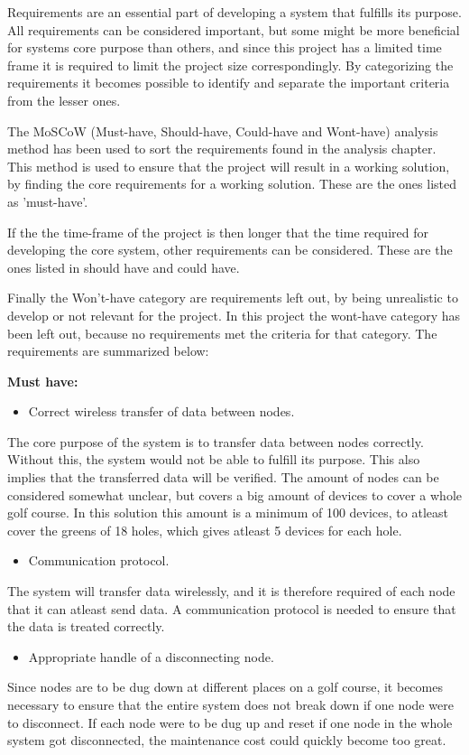 Requirements are an essential part of developing a system that fulfills its purpose. All requirements can be considered important, but some might be more beneficial for systems core purpose than others, and since this project has a limited time frame it is required to limit the project size correspondingly. By categorizing the requirements it becomes possible to identify and separate the important criteria from the lesser ones.

The MoSCoW (Must-have, Should-have, Could-have and Wont-have) analysis method has been used to sort the requirements found in the analysis chapter. This method is used to ensure that the project will result in a working solution, by finding the core requirements for a working solution. These are the ones listed as 'must-have'.

If the the time-frame of the project is then longer that the time required for developing the core system, other requirements can be considered. These are the ones listed in should have and could have. 

Finally the Won't-have category are requirements left out, by being unrealistic to develop or not relevant for the project. In this project the wont-have category has been left out, because no requirements met the criteria for that category. The requirements are summarized below:

\textbf{Must have:}
\begin{itemize}
\item Correct wireless transfer of data between nodes.
\end{itemize}
The core purpose of the system is to transfer data between nodes correctly. Without this, the system would not be able to fulfill its purpose. This also implies that the transferred data will be verified. The amount of nodes can be considered somewhat unclear, but covers a big amount of devices to cover a whole golf course. In this solution this amount is a minimum of 100 devices, to atleast cover the greens of 18 holes, which gives atleast 5 devices for each hole. 


\begin{itemize}
\item Communication protocol.
\end{itemize}
The system will transfer data wirelessly, and it is therefore required of each node that it can atleast send data. A communication protocol is needed to ensure that the data is treated correctly.


\begin{itemize}
\item Appropriate handle of a disconnecting node.
\end{itemize}
Since nodes are to be dug down at different places on a golf course, it becomes necessary to ensure that the entire system does not break down if one node were to disconnect. If each node were to be dug up and reset if one node in the whole system got disconnected, the maintenance cost could quickly become too great.


